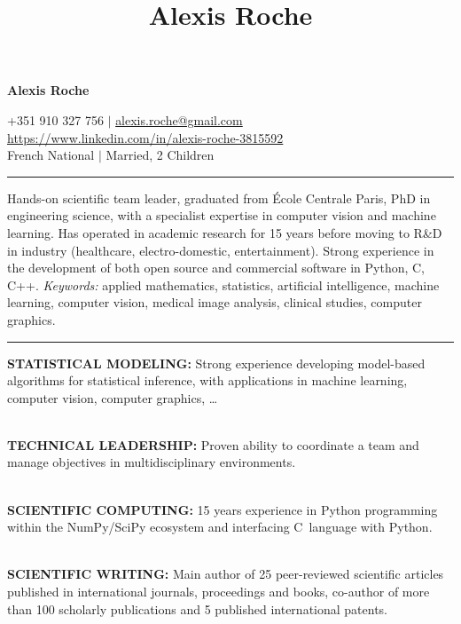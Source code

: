 \documentclass[english,10pt,a4paper]{scrartcl}
\title{Alexis Roche}
\author{}
\date{}
\newcommand{\heading}[1]{\vspace*{.75cm}\noindent{\Large{#1}}\vspace*{-.25cm}\newline\noindent\rule{\textwidth}{0.8pt}\vspace*{.25cm}}
\begin{document}


\begin{flushright} 
{\huge {\textbf{Alexis Roche}}}\\
\begin{small}
+351 910 327 756 $\mid$ \url{alexis.roche@gmail.com}\\
\url{https://www.linkedin.com/in/alexis-roche-3815592}\\
French National $\mid$ Married, 2 Children\\
\end{small}
\end{flushright}


\heading{Professional Profile}

\noindent Hands-on scientific team leader, graduated from \'Ecole Centrale Paris, PhD in engineering science, with a specialist expertise in computer vision and machine learning. Has operated in academic research for 15 years before moving to R\&D in industry (healthcare, electro-domestic, entertainment). Strong experience in the development of both open source and commercial software in Python, C, C++. {\em Keywords:} applied mathematics, statistics, artificial intelligence, machine learning, computer vision, medical image analysis, clinical studies, computer graphics. 


\heading{Key Skills}

\noindent \textbf{STATISTICAL MODELING:} Strong experience developing model-based algorithms for statistical inference, with applications in machine learning, computer vision, computer graphics, \ldots

\ \\
\noindent \textbf{TECHNICAL LEADERSHIP:} Proven ability to coordinate a team and manage objectives in multidisciplinary environments.

\ \\
\noindent \textbf{SCIENTIFIC COMPUTING:} 15 years experience in Python programming within the NumPy/SciPy ecosystem and interfacing C~language with Python.

\ \\
\noindent \textbf{SCIENTIFIC WRITING:} Main author of 25 peer-reviewed scientific articles published in international journals, proceedings and books, co-author of more than 100 scholarly publications and 5 published international patents.
\end{document}
